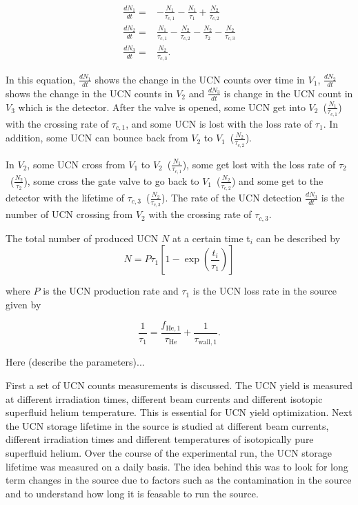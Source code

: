 \begin{equation}
  \begin{aligned}
    \frac{dN_1}{dt} =&- \frac{N_1}{\tau_{c,1}} - \frac{N_1}{\tau_1} + \frac{N_2}{\tau_{c,2}}  \\
    \frac{dN_2}{dt} =& \frac{N_1}{\tau_{c,1}} - \frac{N_2}{\tau_{c,2}} - \frac{N_2}{\tau_2} - \frac{N_2}{\tau_{c,3}} \\
    \frac{dN_3}{dt} =& \frac{N_2}{\tau_{c,3}}.
  \end{aligned}
\end{equation}

In this equation, $\frac{dN_1}{dt}$ shows the change in the UCN counts
over time in $V_1$, $\frac{dN_2}{dt}$ shows the change in the UCN
counts in $V_2$ and $\frac{dN_3}{dt}$ is change in the UCN count in
$V_3$ which is the detector. After the valve is opened, some UCN get
into $V_2$~($\frac{N_1}{\tau_{c,1}}$) with the crossing rate of
$\tau_{c,1}$, and some UCN is lost with the loss rate of $\tau_1$. In
addition, some UCN can bounce back from $V_2$ to
$V_1$~($\frac{N_2}{\tau_{c,2}}$).

In $V_2$, some UCN cross from $V_1$ to
$V_2$~($\frac{N_1}{\tau_{c,1}}$), some get lost with the loss rate of
$\tau_2$~($\frac{N_2}{\tau_2}$), some cross the gate valve to go back
to $V_1$~($\frac{N_2}{\tau_{c,2}}$) and some get to the detector with
the lifetime of $\tau_{c,3}$~($\frac{N_2}{\tau_{c,3}}$). The rate of
the UCN detection $\frac{dN_3}{dt}$ is the number of UCN crossing from
$V_2$ with the crossing rate of $\tau_{c,3}$.






The total number of produced UCN $N$ at a certain time t$_i$ can be
described by
\begin{equation}
  \label{eq:totalUCN}
  N = P \tau_1\left[ 1- \exp \left(\frac{t_i }{ \tau_1}\right) \right]
\end{equation}

where $P$ is the UCN production rate and $\tau_1$ is the UCN loss rate
in the source given by

\begin{equation}
  \frac{1}{\tau_1} = \frac{ f_\mathrm{He,1}}{\tau_\mathrm{He}} + \frac{1}{\tau_\mathrm{wall,1}}.
\end{equation}

Here (describe the parameters)...

First a set of UCN counts measurements is discussed. The UCN yield is
measured at different irradiation times, different beam currents and
different isotopic superfluid helium temperature. This is essential
for UCN yield optimization.  Next the UCN storage lifetime in the
source is studied at different beam currents, different irradiation
times and different temperatures of isotopically pure superfluid
helium. Over the course of the experimental run, the UCN storage
lifetime was measured on a daily basis. The idea behind this was to
look for long term changes in the source due to factors such as the
contamination in the source and to understand how long it is feasable
to run the source.






